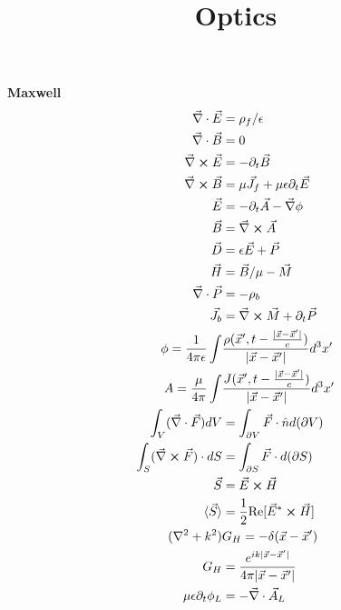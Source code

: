 \documentclass[12pt]{article}
\title{\vspace{-2em}Optics}
\date{}
\begin{document}
\maketitle

\vspace{-4em}
\begin{multicols}{3}
\textbf{Maxwell}
\begin{align}
  \vec{\nabla} \cdot \vec{E} &= \rho_f / \epsilon\\
  \vec{\nabla} \cdot \vec{B} &= 0\\
  \vec{\nabla} \cross \vec{E} &= - \partial_t \vec{B}\\
  \vec{\nabla} \cross \vec{B} &= \mu \vec{J}_f +
  \mu \epsilon \partial_t \vec{E}\\
  \vec{E} &= -\partial_t \vec{A} - \vec{\nabla} \phi\\
  \vec{B} &= \vec{\nabla} \cross \vec{A}\\
  \vec{D} &= \epsilon \vec{E} + \vec{P}\\
  \vec{H} &= \vec{B}/\mu - \vec{M}\\
  \vec{\nabla} \cdot \vec{P} &= -\rho_b\\
  \vec{J}_b &= \vec{\nabla} \cross \vec{M} + \partial_t \vec{P}\\
  \phi = \frac{1}{4\pi\epsilon} \int &\frac{
    \rho(\vec{x}^{\prime}, t - \frac{\lvert\vec{x} - \vec{x}^{\prime}\rvert}{c})}{
    \lvert \vec{x} - \vec{x}^{\prime} \rvert} d^3 x^{\prime}\\
  A = \frac{\mu}{4\pi} \int &\frac{J(\vec{x}^{\prime},
    t - \frac{\lvert \vec{x} - \vec{x}^{\prime} \rvert}{c})}
  {\lvert \vec{x} - \vec{x}^{\prime} \rvert} d^3 x^{\prime}\\
  \int_V (\vec{\nabla} \cdot \vec{F}) dV &= \int_{\partial V} \vec{F} \cdot \hat{n} d(\partial V)\\
  \int_{S} (\vec{\nabla} \cross \vec{F}) \cdot dS &= \int_{\partial S} \vec{F} \cdot d(\partial S)\\
  \vec{S} &= \vec{E} \cross \vec{H}\\
  \langle \vec{S} \rangle &= \frac{1}{2}
  \textrm{Re}[\vec{E}^{*} \cross \vec{H}]\\
  (\nabla^2 + k^2) &G_{H} =
  -\delta(\vec{x} - \vec{x}^{\prime})\\
  G_H &= \frac{e^{ik\lvert \vec{x}
      - \vec{x}^{\prime} \rvert}}{4\pi \lvert \vec{x} - \vec{x}^{\prime} \rvert}\\
  \mu \epsilon \partial_t \phi_L &= -\vec{\nabla} \cdot \vec{A}_L\\

\end{align}
\end{multicols}
\end{document}

